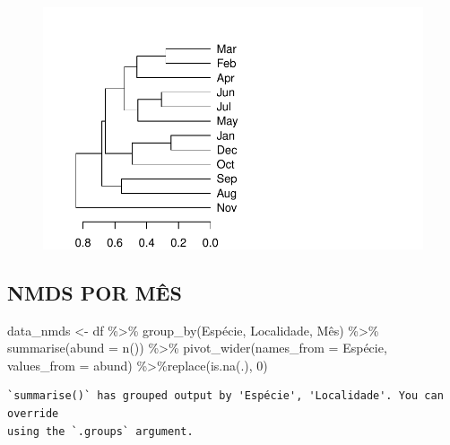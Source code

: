 \documentclass[
  letterpaper,
  DIV=11,
  numbers=noendperiod]{scrartcl}
\newenvironment{Shaded}{\begin{snugshade}}{\end{snugshade}}
\newcommand{\AttributeTok}[1]{\textcolor[rgb]{0.40,0.45,0.13}{#1}}
\newcommand{\DecValTok}[1]{\textcolor[rgb]{0.68,0.00,0.00}{#1}}
\newcommand{\FunctionTok}[1]{\textcolor[rgb]{0.28,0.35,0.67}{#1}}
\newcommand{\NormalTok}[1]{\textcolor[rgb]{0.00,0.23,0.31}{#1}}
\newcommand{\OtherTok}[1]{\textcolor[rgb]{0.00,0.23,0.31}{#1}}
\newcommand{\SpecialCharTok}[1]{\textcolor[rgb]{0.37,0.37,0.37}{#1}}
\begin{document}
\begin{figure}[H]

{\centering \includegraphics{report_nmds_files/figure-pdf/unnamed-chunk-23-1.pdf}

}

\end{figure}

\hypertarget{nmds-por-muxeas}{%
\subsection{NMDS POR MÊS}\label{nmds-por-muxeas}}

\begin{Shaded}
\begin{Highlighting}[]
\NormalTok{data\_nmds }\OtherTok{\textless{}{-}}
\NormalTok{  df }\SpecialCharTok{\%\textgreater{}\%}
  \FunctionTok{group\_by}\NormalTok{(Espécie, Localidade, Mês) }\SpecialCharTok{\%\textgreater{}\%}
  \FunctionTok{summarise}\NormalTok{(}\AttributeTok{abund =} \FunctionTok{n}\NormalTok{()) }\SpecialCharTok{\%\textgreater{}\%}
  \FunctionTok{pivot\_wider}\NormalTok{(}\AttributeTok{names\_from =}\NormalTok{ Espécie, }\AttributeTok{values\_from =}\NormalTok{ abund) }\SpecialCharTok{\%\textgreater{}\%}\FunctionTok{replace}\NormalTok{(}\FunctionTok{is.na}\NormalTok{(.), }\DecValTok{0}\NormalTok{)}
\end{Highlighting}
\end{Shaded}

\begin{verbatim}
`summarise()` has grouped output by 'Espécie', 'Localidade'. You can override
using the `.groups` argument.
\end{verbatim}
\end{document}
